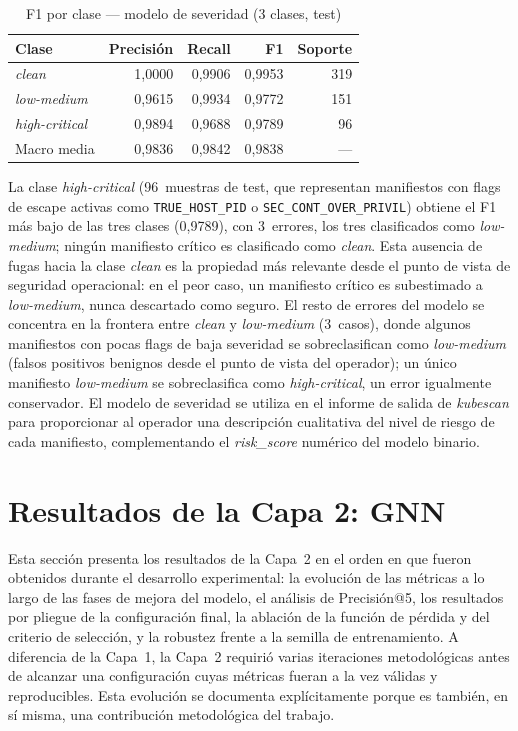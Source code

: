 \begin{table}[htbp]
\centering
\caption{F1 por clase — modelo de severidad (3 clases, test)}
\label{tab:severity_f1}
\begin{tabular}{@{}lrrrr@{}}
\toprule
Clase & Precisión & Recall & F1 & Soporte \\
\midrule
\textit{clean}          & 1,0000 & 0,9906 & 0,9953 & 319 \\
\textit{low-medium}     & 0,9615 & 0,9934 & 0,9772 & 151 \\
\textit{high-critical}  & 0,9894 & 0,9688 & 0,9789 & 96 \\
\midrule
Macro media & 0,9836 & 0,9842 & 0,9838 & — \\
\bottomrule
\end{tabular}
\fuentepropia
\end{table}

La clase \textit{high-critical} (96~muestras de test, que representan manifiestos con
flags de escape activas como \texttt{TRUE\_HOST\_PID} o \texttt{SEC\_CONT\_OVER\_PRIVIL})
obtiene el F1 más bajo de las tres clases (0,9789), con 3~errores, los tres clasificados
como \textit{low-medium}; ningún manifiesto crítico es clasificado como \textit{clean}.
Esta ausencia de fugas hacia la clase \textit{clean} es la propiedad más relevante desde
el punto de vista de seguridad operacional: en el peor caso, un manifiesto crítico es
subestimado a \textit{low-medium}, nunca descartado como seguro. El resto de errores del
modelo se concentra en la frontera entre \textit{clean} y \textit{low-medium} (3~casos), donde
algunos manifiestos con pocas flags de baja severidad se sobreclasifican como
\textit{low-medium} (falsos positivos benignos desde el punto de vista del operador); un
único manifiesto \textit{low-medium} se sobreclasifica como \textit{high-critical}, un error
igualmente conservador. El modelo de severidad se utiliza en el informe de salida
de \textit{kubescan} para proporcionar al operador una descripción cualitativa
del nivel de riesgo de cada manifiesto, complementando el \textit{risk\_score}
numérico del modelo binario.

\section{Resultados de la Capa 2: \acs{GNN}}
\label{sec:layer2}

Esta sección presenta los resultados de la Capa~2 en el orden en que fueron
obtenidos durante el desarrollo experimental: la evolución de las métricas a lo
largo de las fases de mejora del modelo, el análisis de Precisión@5, los
resultados por pliegue de la configuración final, la ablación de la función de
pérdida y del criterio de selección, y la robustez frente a la semilla de
entrenamiento. A diferencia de la Capa~1, la Capa~2 requirió varias iteraciones
metodológicas antes de alcanzar una configuración cuyas métricas fueran a la vez
válidas y reproducibles. Esta evolución se documenta explícitamente porque es
también, en sí misma, una contribución metodológica del trabajo.

